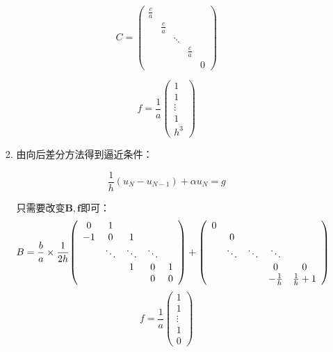 \documentclass{ctexart}
\begin{document}
\begin{enumerate}
\begin{enumerate}
\begin{enumerate}
 \begin{equation*}
C={
\left ( \begin{array}{ccccc}
\frac{c}{a} &  &  & &  \\
& \frac{c}{a} &  & & \\
  & & \ddots & & \\
  & & &\frac{c}{a} &\\
  &  & & &0
\end{array} 
\right )}
\end{equation*}

\begin{equation*}
f=\frac{1}{a}{
\left ( \begin{array}{c}
1\\
1\\
\vdots \\
1\\
h^3
\end{array} 
\right )}
\end{equation*}

\item 由向后差分方法得到逼近条件：

\[ \frac{1}{h}(u_N-u_{N-1})+\alpha u_N=g\]

只需要改变\(\bm{B}, \bm{f}\)即可：
\begin{equation*}
B=\frac{b}{a}\times\frac{1}{2h}{
\left ( \begin{array}{ccccc}
0 & 1 &  & &  \\
-1& 0 & 1 & & \\
  & \ddots & \ddots &\ddots & \\
  & &\-1 &0 &1\\
  &  & &0 &0
\end{array} 
\right )}
+{
\left ( \begin{array}{ccccc}
 0&  &  & &  \\
&0  & & & \\
  & \ddots & \ddots &\ddots & \\
  & &\ &0 &0\\
  &  & &-\frac{1}{h} &\frac{1}{h}+1
\end{array} 
\right )}
\end{equation*}
\begin{equation*}
f=\frac{1}{a}{
\left ( \begin{array}{c}
1\\
1\\
\vdots \\
1\\
0
\end{array} 
\right )}
\end{equation*}


\end{enumerate}
\end{enumerate}
\end{enumerate}
\end{document}
